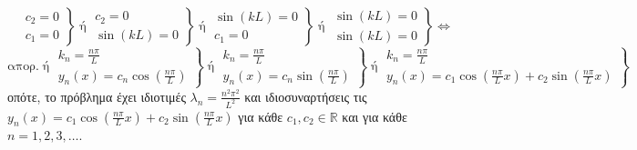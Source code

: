 \begin{solution}
\begin{myitemize}
\[      \]
      \[
        \left.
          \begin{matrix}
            c_{2} = 0 \\
            c_{1} = 0
          \end{matrix} 
        \right\} \; \text{ή} \; 
        \left.
          \begin{matrix}
            c_{2} = 0 \\
            \sin{(kL)} = 0 
          \end{matrix} 
        \right\} \; \text{ή} \; 
        \left.
          \begin{matrix}
            \sin{(kL)} = 0 \\
            c_{1} = 0 
          \end{matrix} 
        \right\} \; \text{ή} \; 
        \left.
          \begin{matrix}
            \sin{(kL)} = 0 \\
            \sin{(kL)} = 0 
          \end{matrix} 
        \right\} \Leftrightarrow 
      \]
      \[
        \text{απορ.} \; \text{ή} \; 
        \left.
          \begin{matrix}
            k_{n} = \frac{n \pi}{L} \\
            y_{n}(x) = c_{n} \cos{\left(\frac{n \pi}{L}\right)} 
          \end{matrix} 
        \right\} \; \text{ή} \; 
        \left.
          \begin{matrix}
            k_{n} = \frac{n \pi}{L} \\
            y_{n}(x) = c_{n} \sin{\left(\frac{n \pi}{L}\right)} 
          \end{matrix} 
        \right\} \; \text{ή} \;
        \left.
          \begin{matrix}
            k_{n} = \frac{n \pi}{L} \\
            y_{n}(x) = c_{1} \cos{\left(\frac{n \pi}{L} x\right)} + c_{2} 
            \sin{\left(\frac{n \pi}{L} x\right)} 
          \end{matrix}
        \right\} 
      \]
      οπότε, το πρόβλημα έχει ιδιοτιμές $ \lambda _{n} = \frac{n^{2} \pi ^{2}}{L^{2}} $
      και ιδιοσυναρτήσεις τις 
      $ y_{n}(x) = c_{1} \cos{\left(\frac{n \pi}{L} x\right)} + c_{2} 
      \sin{\left(\frac{n \pi}{L} x\right)} $ για κάθε $ c_{1}, c_{2} \in \mathbb{R} $ 
      και για κάθε $ n = 1,2,3,\ldots$.
  \end{myitemize}
\end{solution}






